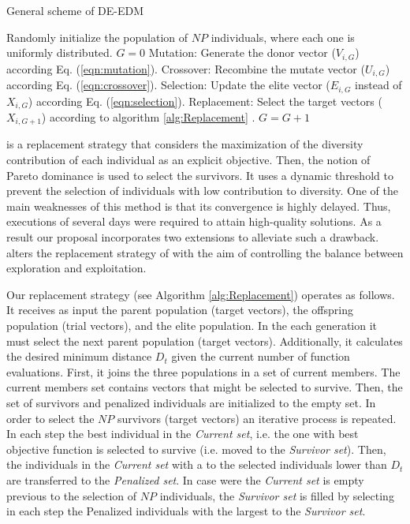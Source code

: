 \begin{algorithm}[H]
  \scriptsize
	\caption{General scheme of DE-EDM} 
	\begin{algorithmic}[1]
	\STATE Randomly initialize the population of $NP$ individuals, where each one is uniformly distributed.
	\STATE $G=0$
		\STATE Mutation: Generate the donor vector ($V_{i,G}$) according Eq. (\ref{eqn:mutation}).
		\STATE Crossover: Recombine the mutate vector ($U_{i,G}$) according Eq. (\ref{eqn:crossover}).
		\STATE Selection: Update the elite vector ($E_{i,G}$ instead of $X_{i,G}$) according Eq. (\ref{eqn:selection}).
		\STATE Replacement: Select the target vectors ($X_{i,G+1}$) according to algorithm \ref{alg:Replacement} .
	   \ENDFOR
	   \STATE $G=G+1$
	\ENDWHILE
    \label{alg:Fase_Remplazo_VSD-MOEAD}
\end{algorithmic}
\end{algorithm}



\RMDDC{} is a replacement strategy that considers the maximization of the diversity 
contribution of each individual as an explicit objective.
%
Then, the notion of Pareto dominance is used to select the survivors.
%
It uses a dynamic threshold to prevent the selection of individuals with low contribution to diversity.
%
One of the main weaknesses of this method is that its convergence is highly delayed.
%
Thus, executions of several days were required to attain high-quality solutions.
%
As a result our proposal incorporates two extensions to alleviate such a drawback.
%
\DEEDM{} alters the replacement strategy of \DE{} with the aim of controlling the 
balance between exploration and exploitation.
%
%

Our replacement strategy (see Algorithm \ref{alg:Replacement}) operates as follows.
%
It receives as input the parent population (target vectors), the offspring population (trial vectors), and the elite population.
%
In the each generation it must select the next parent population (target vectors).
%
Additionally, it calculates the desired minimum distance $D_t$ given the current number of function evaluations.
%
First, it joins the three populations in a set of current members.
%
The current members set contains vectors that might be selected to survive.
%
Then, the set of survivors and penalized individuals are initialized to the empty set.
%
In order to select the $NP$ survivors (target vectors) an iterative process is repeated.
%
In each step the best individual in the \textit{Current set}, i.e. the one with best objective function is selected
to survive (i.e. moved to the \textit{Survivor set}).
%
Then, the individuals in the \textit{Current set} with a \DCN{} to the selected individuals lower than $D_t$ are transferred to the
\textit{Penalized set}.
%
In case were the \textit{Current set} is empty previous to the selection of $NP$ individuals, the \textit{Survivor set} is filled by selecting in each step the Penalized individuals with the largest \DCN{} to the \textit{Survivor set}.


